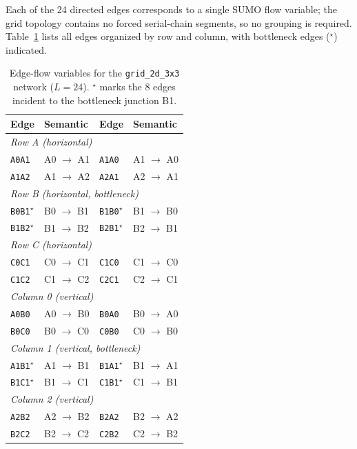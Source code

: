 \documentclass[11pt]{article}
\begin{document}
Each of the 24 directed edges corresponds to a single SUMO flow variable; the
grid topology contains no forced serial-chain segments, so no grouping is
required. Table~\ref{tab:groups_grid2d3x3} lists all edges organized by row
and column, with bottleneck edges ($^\star$) indicated.






\begin{table}[h]
\centering
\captionsetup{width=0.7\textwidth}
\caption{Edge-flow variables for the \texttt{grid\_2d\_3x3} network ($L=24$).
$^\star$ marks the 8 edges incident to the bottleneck junction B1.}
\label{tab:groups_grid2d3x3}
\begin{tabular}{llll}
\hline
\textbf{Edge} & \textbf{Semantic} & \textbf{Edge} & \textbf{Semantic} \\
\hline
\multicolumn{4}{l}{\textit{Row A (horizontal)}} \\
\texttt{A0A1} & A0 $\to$ A1 & \texttt{A1A0} & A1 $\to$ A0 \\
\texttt{A1A2} & A1 $\to$ A2 & \texttt{A2A1} & A2 $\to$ A1 \\
\multicolumn{4}{l}{\textit{Row B (horizontal, bottleneck)}} \\
\texttt{B0B1}$^\star$ & B0 $\to$ B1 & \texttt{B1B0}$^\star$ & B1 $\to$ B0 \\
\texttt{B1B2}$^\star$ & B1 $\to$ B2 & \texttt{B2B1}$^\star$ & B2 $\to$ B1 \\
\multicolumn{4}{l}{\textit{Row C (horizontal)}} \\
\texttt{C0C1} & C0 $\to$ C1 & \texttt{C1C0} & C1 $\to$ C0 \\
\texttt{C1C2} & C1 $\to$ C2 & \texttt{C2C1} & C2 $\to$ C1 \\
\multicolumn{4}{l}{\textit{Column 0 (vertical)}} \\
\texttt{A0B0} & A0 $\to$ B0 & \texttt{B0A0} & B0 $\to$ A0 \\
\texttt{B0C0} & B0 $\to$ C0 & \texttt{C0B0} & C0 $\to$ B0 \\
\multicolumn{4}{l}{\textit{Column 1 (vertical, bottleneck)}} \\
\texttt{A1B1}$^\star$ & A1 $\to$ B1 & \texttt{B1A1}$^\star$ & B1 $\to$ A1 \\
\texttt{B1C1}$^\star$ & B1 $\to$ C1 & \texttt{C1B1}$^\star$ & C1 $\to$ B1 \\
\multicolumn{4}{l}{\textit{Column 2 (vertical)}} \\
\texttt{A2B2} & A2 $\to$ B2 & \texttt{B2A2} & B2 $\to$ A2 \\
\texttt{B2C2} & B2 $\to$ C2 & \texttt{C2B2} & C2 $\to$ B2 \\
\hline
\end{tabular}
\end{table}
\end{document}
